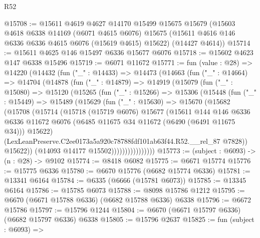 \begin{lexlean}{R52}
\begin{coremodule}
@15708 := @15611
    @4619
    @4627
    @14170
    @15499
    @15675
    @15679
    (@15603
      @4618
      @6338
      @14169
      (@6071 @4615 @6076)
      @15675
      (@15611 @4616 @146 @6336 @6336 @4615 @6076 (@15619 @4615) @15622)
      (@14427 @4614))
@15714 := @15611 @4625 @146 @15497 @6336 @15677 @6076
@15718 := @15602 @4623 @147 @6338 @15496
@15719 := @6071 @11672
@15771 := fun (value : @28) =>
  @14220
    (@14432
      (fun ("_" : @14433) =>
      @14473
        (@14663
          (fun ("_" : @14664) =>
          @14704
            (@14878
              (fun ("_" : @14879) =>
              @14919
                (@15079
                  (fun ("_" : @15080) =>
                  @15120
                    (@15265
                      (fun ("_" : @15266) =>
                      @15306
                        (@15448
                          (fun ("_" : @15449) =>
                          @15489
                            (@15629
                              (fun ("_" : @15630) =>
                              @15670
                                (@15682
                                  (@15708
                                    (@15714
                                      (@15718
                                        (@15719 @6076)
                                        @15677
                                        (@15611
                                          @144
                                          @146
                                          @6336
                                          @6336
                                          @11672
                                          @6076
                                          (@6485 @11675 @34 @11672 (@6490 (@6491 @11675 @34)))
                                          @15622)
                                        (LexLeanPreserve.C2ee0173a5a920c78788fdf101ab63f44.R52.__rel_87
                                          @7828))
                                      @15622))
                                  (@14093 @14177 @15502))))))))))))))))
@15773 := (subject : @6093) -> (n : @28) -> @9102
@15774 := @8418 @6082
@15775 := @6671 @15774
@15776 := @15775 @6336
@15780 := @6670 @15776 (@6682 @15774 @6336)
@15781 := @13341 @6164
@15784 := @6335 (@6666 (@15781 @6073))
@15785 := @13345 @6164
@15786 := @15785 @6073
@15788 := @8098 @15786 @1212
@15795 := @6670 (@6671 @15788 @6336) (@6682 @15788 @6336) @6338
@15796 := @6672 @15786
@15797 := @15796 @1244
@15804 := @6670 (@6671 @15797 @6336) (@6682 @15797 @6336) @6338
@15805 := @15796 @2637
@15825 := fun (subject : @6093) =>

\end{coremodule}
\end{lexlean}
